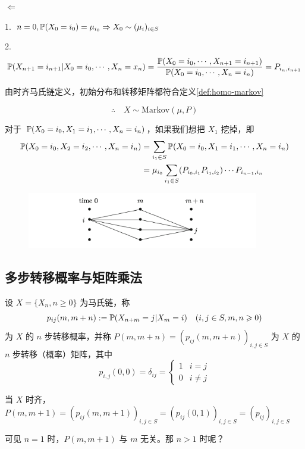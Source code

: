 $\Leftarrow$ 

1. $n=0, \mathbb{P}(X_0=i_0)=\mu_{i_0}\Rightarrow X_0\sim (\mu_i)_{i\in S}$

2. 
\[
\mathbb{P}(X_{n+1}=i_{n+1}|X_0=i_0,\cdots,X_n=x_n)=\frac{\mathbb{P}(X_0=i_0,\cdots,X_{n+1}=i_{n+1})}{\mathbb{P}(X_0=i_0,\cdots, X_n=i_n)}=P_{i_n,i_{n+1}}
\]

由时齐马氏链定义，初始分布和转移矩阵都符合定义\ref{def:homo-markov}

\[
\therefore \quad X\sim \text{Markov}(\mu,P)
\]

对于 $\mathbb{P}(X_0=i_0,X_1=i_1,\cdots,X_{n}=i_{n})$，如果我们想把 $X_1$ 挖掉，即
\[
\begin{aligned}
    \mathbb{P}(X_0=i_0,X_2=i_2,\cdots,X_{n}=i_{n})&=\sum_{i_1\in S}\mathbb{P}(X_0=i_0,X_1=i_1,\cdots,X_{n}=i_{n})\\
    &=\mu_{i_0}\sum_{i_1\in S}(P_{i_0,i_1}P_{i_1,i_2})\cdots P_{i_{n-1},i_n}
\end{aligned}
\]

\begin{figure}[H]
    \centering
    \includegraphics[width=0.9\textwidth]{figures/split_steps.png}
\end{figure}

\subsection{多步转移概率与矩阵乘法}

\begin{definition}
    设 $X=\{X_n,n\geq 0\}$ 为马氏链，称
    \[
    p_{ij}(m,m+n):=\mathbb{P}(X_{n+m}=j|X_m=i)\quad (i,j\in S, m,n\geqslant 0)
    \]
    为 $X$ 的 $n$ 步转移概率，并称 $P(m,m+n)=(p_{ij}(m,m+n))_{i,j\in S}$ 为 $X$ 的 $n$ 步转移（概率）矩阵，其中
    \[
    p_{i,j}(0,0)=\delta_{ij}=\begin{cases}
        1 & i=j\\
        0 & i\neq j
    \end{cases}
    \]
\end{definition}

当 $X$ 时齐，$P(m,m+1)=(p_{ij}(m,m+1))_{i,j\in S}=(p_{ij}(0,1))_{i,j\in S}=(p_{ij})_{i,j\in S}$

可见 $n=1$ 时，$P(m,m+1)$ 与 $m$ 无关。那 $n>1$ 时呢？

